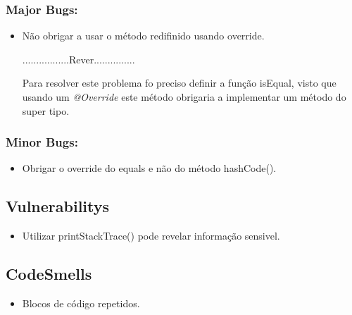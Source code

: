 \subsubsection{Major Bugs:}
\begin{itemize}
\item Não obrigar a usar o método redifinido usando override.\newline


.................Rever...............
\par Para resolver este problema fo preciso definir a função isEqual, visto que usando um \textit{@Override} este método obrigaria a implementar um método do super tipo.

\end{itemize}

\subsubsection{Minor Bugs:}
\begin{itemize}
\item Obrigar o override do equals e não do método hashCode().\newline
\end{itemize}


\subsection{Vulnerabilitys}
\begin{itemize}
\item Utilizar printStackTrace() pode revelar informação sensivel.\newline
\end{itemize}

\subsection{CodeSmells}

\begin{itemize}
\item Blocos de código repetidos.\newline
\end{itemize}





